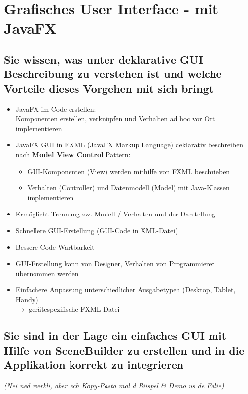 \documentclass[a4paper]{article}
\begin{document}
	\newpage
	\section{Grafisches User Interface - mit JavaFX}	
		
		\subsection{Sie wissen, was unter deklarative GUI Beschreibung zu verstehen ist und welche Vorteile dieses Vorgehen mit sich bringt}
		
		\begin{itemize}
			\item JavaFX im Code erstellen: \\
			Komponenten erstellen, verknüpfen und Verhalten ad hoc vor Ort implementieren
			\item JavaFX GUI in FXML (JavaFX Markup Language) deklarativ beschreiben \\
			nach \textbf{Model View Control} Pattern:
				\begin{itemize}
					\item GUI-Komponenten (View) werden mithilfe von FXML beschrieben
					\item Verhalten (Controller) und Datenmodell (Model) mit Java-Klassen implementieren
				\end{itemize}
			\item Ermöglicht Trennung zw. Modell / Verhalten und der Darstellung
			\item Schnellere GUI-Erstellung (GUI-Code in XML-Datei)
			\item Bessere Code-Wartbarkeit
			\item GUI-Erstellung kann von Designer, Verhalten von Programmierer übernommen werden
			\item Einfachere Anpassung unterschiedlicher Ausgabetypen (Desktop, Tablet, Handy)\\
			$\rightarrow$ gerätespezifische FXML-Datei
		\end{itemize}
		
		\subsection{Sie sind in der Lage ein einfaches GUI mit Hilfe von SceneBuilder zu erstellen und in die Applikation korrekt zu integrieren}
		
		\textit{(Nei ned werkli, aber ech Kopy-Pasta mol d Biispel \& Demo us de Folie)}
		
\end{document}
